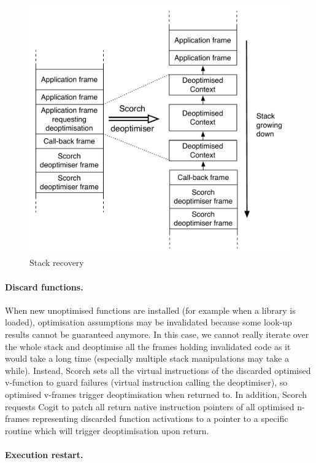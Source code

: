 \documentclass[a4paper,12pt,twoside]{../includes/ThesisStyle}
\begin{document}
\begin{figure}[h!]
    \begin{center}
		\includegraphics[width=0.80\linewidth]{DeoptStacks}
        \caption{Stack recovery}
        \label{fig:DeoptStacks}
    \end{center}
\end{figure}

\paragraph{Discard functions.} When new unoptimised functions are installed (for example when a library is loaded), optimisation assumptions may be invalidated because some look-up results cannot be guaranteed anymore. In this case, we cannot really iterate over the whole stack and deoptimise all the frames holding invalidated code as it would take a long time (especially multiple stack manipulations may take a while). Instead, Scorch sets all the virtual instructions of the discarded optimised v-function to guard failures (virtual instruction calling the deoptimiser), so optimised v-frames trigger deoptimisation when returned to. In addition, Scorch requests Cogit to patch all return native instruction pointers of all optimised n-frames representing discarded function activations to a pointer to a specific routine which will trigger deoptimisation upon return.

\paragraph{Execution restart.}
\end{document}
